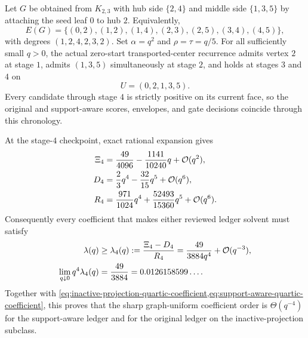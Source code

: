 \begin{proposition}
\label{prop:consumed-energy-quartic-lower}
Let $G$ be obtained from $K_{2,3}$ with hub side $\{2,4\}$ and middle side
$\{1,3,5\}$ by attaching the seed leaf $0$ to hub $2$.  Equivalently,
\begin{equation*}
 E(G)=\{(0,2),(1,2),(1,4),(2,3),(2,5),(3,4),(4,5)\},
\end{equation*}
with degrees $(1,2,4,2,3,2)$.  Set
$\alpha=q^2$ and $\rho=\tau=q/5$.  For all sufficiently small $q>0$, the
actual zero-start transported-center recurrence admits vertex $2$ at stage
$1$, admits $(1,3,5)$ simultaneously at stage $2$, and holds at stages $3$
and $4$ on
\begin{equation*}
 U=(0,2,1,3,5).
\end{equation*}
Every candidate through stage $4$ is strictly positive on its current face,
so the original and support-aware scores, envelopes, and gate decisions
coincide through this chronology.

At the stage-$4$ checkpoint, exact rational expansion gives
\begin{align}
 \Xi_4
 &=\frac{49}{4096}-\frac{1141}{10240}q+\mathcal{O}(q^2),
 \label{eq:quartic-family-score}\\
 D_4
 &=\frac23q^4-\frac{32}{15}q^5+\mathcal{O}(q^6),
 \label{eq:quartic-family-credit}\\
 R_4
 &=\frac{971}{1024}q^4+\frac{52493}{15360}q^5+\mathcal{O}(q^6).
 \label{eq:quartic-family-reserve}
\end{align}
Consequently every coefficient that makes either reviewed ledger solvent must
satisfy
\begin{align}
 \lambda(q)
 &\geq\lambda_4(q):=\frac{\Xi_4-D_4}{R_4}
  =\frac{49}{3884q^4}+\mathcal{O}(q^{-3}),
 \label{eq:quartic-family-required-coefficient}\\
 \lim_{q\downarrow0}q^4\lambda_4(q)
 &=\frac{49}{3884}=0.0126158599\ldots.
 \label{eq:quartic-family-limit}
\end{align}
Together with
\cref{eq:inactive-projection-quartic-coefficient,eq:support-aware-quartic-coefficient},
this proves that the sharp graph-uniform coefficient order is
$\Theta(q^{-4})$ for the support-aware ledger and for the original ledger on
the inactive-projection subclass.
\end{proposition}

